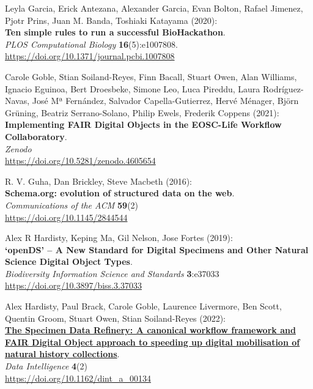 \begin{thebibliography}{9}
Leyla Garcia, Erick Antezana, Alexander Garcia, Evan Bolton,
Rafael Jimenez, Pjotr Prins, Juan M. Banda, Toshiaki Katayama (2020):\\
\textbf{Ten simple rules to run a successful BioHackathon}. \\
\emph{PLOS Computational Biology} \textbf{16}(5):e1007808.\\
\url{https://doi.org/10.1371/journal.pcbi.1007808}

Carole Goble, Stian Soiland-Reyes, Finn Bacall, Stuart
Owen, Alan Williams, Ignacio Eguinoa, Bert Droesbeke, Simone Leo, Luca
Pireddu, Laura Rodríguez-Navas, José Mª Fernández, Salvador
Capella-Gutierrez, Hervé Ménager, Björn Grüning, Beatriz Serrano-Solano,
Philip Ewels, Frederik Coppens (2021):\\
\textbf{Implementing FAIR Digital Objects in the EOSC-Life Workflow
Collaboratory}.\\
\emph{Zenodo}\\
\url{https://doi.org/10.5281/zenodo.4605654}

R. V. Guha, Dan Brickley, Steve Macbeth (2016):\\
\textbf{Schema.org: evolution of structured data on the web}.\\
\emph{Communications of the ACM} \textbf{59}(2)\\
\url{https://doi.org/10.1145/2844544}

Alex R Hardisty, Keping Ma, Gil Nelson, Jose Fortes
(2019):\\
\textbf{`openDS' -- A New Standard for Digital Specimens and Other
Natural Science Digital Object Types}.\\
\emph{Biodiversity Information Science and Standards}
\textbf{3}:e37033\\
\url{https://doi.org/10.3897/biss.3.37033}

Alex Hardisty, Paul Brack, Carole Goble, Laurence
Livermore, Ben Scott, Quentin Groom, Stuart Owen, Stian Soiland-Reyes
(2022):\\
\href{../specimen-data-refinery/}{\textbf{The Specimen Data Refinery: A
canonical workflow framework and FAIR Digital Object approach to
speeding up digital mobilisation of natural history collections}}.\\
\emph{Data Intelligence} \textbf{4}(2)\\
\url{https://doi.org/10.1162/dint_a_00134}


\end{thebibliography}
